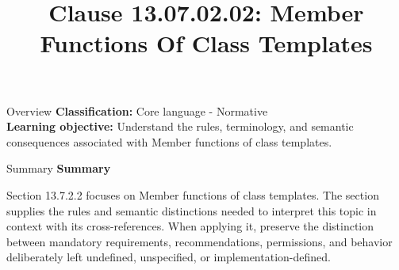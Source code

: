 \documentclass[10pt,letterpaper]{article}
\title{Clause 13.07.02.02: Member Functions Of Class Templates}
\author{}
\date{}
\begin{document}
\maketitle
\begin{CornellOverviewBox}{Overview}
\textbf{Classification:} Core language - Normative\\[2pt]
\textbf{Learning objective:} Understand the rules, terminology, and semantic consequences associated with Member functions of class templates.
\end{CornellOverviewBox}\begin{CornellSummaryBox}{Summary}
{\sffamily\bfseries\color{Accent} Summary}\par\vspace{3pt}Section 13.7.2.2 focuses on Member functions of class templates. The section supplies the rules and semantic distinctions needed to interpret this topic in context with its cross-references. When applying it, preserve the distinction between mandatory requirements, recommendations, permissions, and behavior deliberately left undefined, unspecified, or implementation-defined.
\end{CornellSummaryBox}
\end{document}
